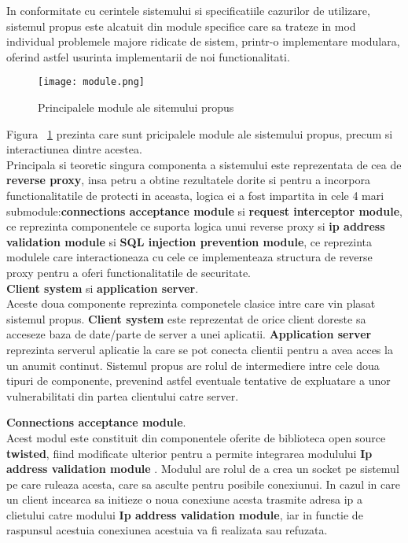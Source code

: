 In conformitate cu cerintele sistemului si specificatiile cazurilor de utilizare, sistemul propus este alcatuit din module specifice care sa trateze in mod individual problemele majore ridicate de sistem, printr-o implementare modulara, oferind astfel usurinta implementarii de noi functionalitati.

\begin{figure}[h]
	\centering
	\texttt{[image: module.png]}
	\caption{Principalele module ale sitemului propus}
	\label{fig:module}
\end{figure}
Figura ~\ref{fig:module} prezinta care sunt pricipalele module ale sistemului propus, precum si interactiunea dintre acestea. \\

Principala si teoretic singura componenta a sistemului este reprezentata de cea de \textbf{reverse proxy}, insa petru a obtine rezultatele dorite si pentru a incorpora functionalitatile de protecti in aceasta, logica ei a fost impartita in cele 4 mari submodule:\textbf{connections acceptance module} si \textbf{request interceptor module}, ce reprezinta componentele ce suporta logica unui reverse proxy si \textbf{ip address validation module} si \textbf{SQL injection prevention module}, ce reprezinta modulele care interactioneaza cu cele ce implementeaza structura de reverse proxy pentru a oferi functionalitatile de securitate.\\




\textbf{Client system} si  \textbf{application server}.\\ 

Aceste doua componente reprezinta componetele clasice intre care vin plasat sistemul propus. \textbf{Client system} este reprezentat de orice client doreste sa acceseze baza de date/parte de server a unei aplicatii. \textbf{Application server} reprezinta serverul aplicatie la care se pot conecta clientii pentru a avea acces la un anumit continut. Sistemul propus are rolul de intermediere intre cele doua tipuri de componente, prevenind astfel eventuale tentative de expluatare a unor vulnerabilitati din partea clientului catre server.


\textbf{Connections acceptance module}.\\

Acest modul este constituit din componentele oferite de biblioteca open source \textbf{twisted}, fiind modificate ulterior pentru a permite integrarea modulului \textbf{Ip address validation module} . Modulul are rolul de a crea un socket pe sistemul pe care ruleaza acesta, care sa asculte pentru posibile conexiunui. In cazul in care un client incearca sa initieze o noua conexiune acesta trasmite adresa ip a clietului catre modului \textbf{Ip address validation module}, iar in functie de raspunsul acestuia conexiunea acestuia va fi realizata sau refuzata.\\ 


